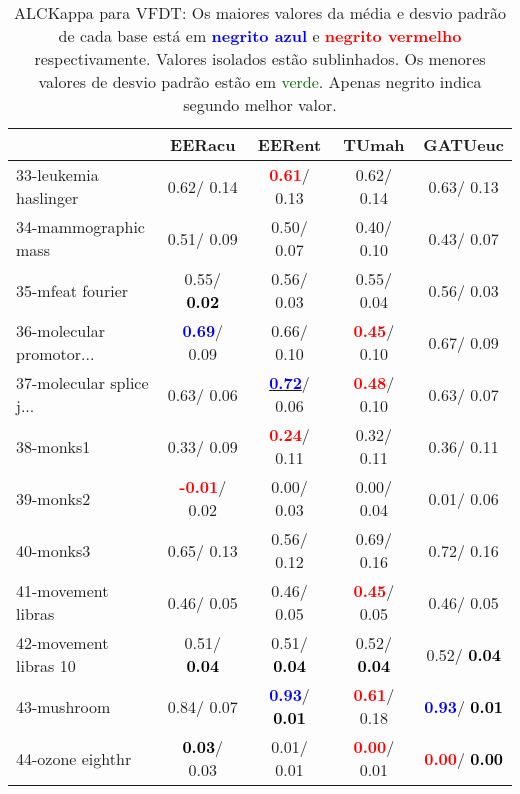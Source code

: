 \begin{table}[h]
\caption{ALCKappa para VFDT: Os maiores valores da média e desvio padrão de cada base está em \textcolor{blue}{\textbf{negrito azul}} e \textcolor{red}{\textbf{negrito vermelho}} respectivamente. Valores isolados estão sublinhados. Os menores valores de desvio padrão estão em \textcolor{darkgreen}{verde}. Apenas negrito indica segundo melhor valor.}
\begin{center}\begin{tabular}{lc|c|c|c}
 & EERacu & EERent & TUmah & \textbf{GATUeuc}\\ \hline 33-leukemia haslinger &   0.62/  0.14 & \textcolor{red}{\textbf{  0.61}}/  0.13 &   0.62/  0.14 &   0.63/  0.13 \\
34-mammographic mass &   0.51/  0.09 &   0.50/  0.07 &   0.40/  0.10 &   0.43/  0.07 \\
35-mfeat fourier &   0.55/\textcolor{black}{\textbf{  0.02}} &   0.56/  0.03 &   0.55/  0.04 &   0.56/  0.03 \\
36-molecular promotor... & \textcolor{blue}{\textbf{  0.69}}/  0.09 &   0.66/  0.10 & \textcolor{red}{\textbf{  0.45}}/  0.10 &   0.67/  0.09 \\
37-molecular splice j... &   0.63/  0.06 & \underline{\textcolor{blue}{\textbf{  0.72}}}/  0.06 & \textcolor{red}{\textbf{  0.48}}/  0.10 &   0.63/  0.07 \\
38-monks1 &   0.33/  0.09 & \textcolor{red}{\textbf{  0.24}}/  0.11 &   0.32/  0.11 &   0.36/  0.11 \\
39-monks2 & \textcolor{red}{\textbf{ -0.01}}/  0.02 &   0.00/  0.03 &   0.00/  0.04 &   0.01/  0.06 \\ \hline
40-monks3 &   0.65/  0.13 &   0.56/  0.12 &   0.69/  0.16 &   0.72/  0.16 \\
41-movement libras &   0.46/  0.05 &   0.46/  0.05 & \textcolor{red}{\textbf{  0.45}}/  0.05 &   0.46/  0.05 \\
42-movement libras 10 &   0.51/\textcolor{black}{\textbf{  0.04}} &   0.51/\textcolor{black}{\textbf{  0.04}} &   0.52/\textcolor{black}{\textbf{  0.04}} &   0.52/\textcolor{black}{\textbf{  0.04}} \\
43-mushroom &   0.84/  0.07 & \textcolor{blue}{\textbf{  0.93}}/\textcolor{black}{\textbf{  0.01}} & \textcolor{red}{\textbf{  0.61}}/  0.18 & \textcolor{blue}{\textbf{  0.93}}/\textcolor{black}{\textbf{  0.01}} \\
44-ozone eighthr & \textcolor{black}{\textbf{  0.03}}/  0.03 &   0.01/  0.01 & \textcolor{red}{\textbf{  0.00}}/  0.01 & \textcolor{red}{\textbf{  0.00}}/\textcolor{black}{\textbf{  0.00}} \\

\end{tabular}
\end{center}
\end{table}

